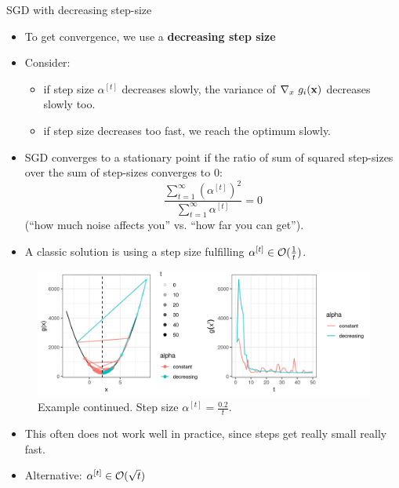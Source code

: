 \documentclass[11pt,compress,t,notes=noshow, xcolor=table]{beamer}
\begin{document}
\begin{vbframe}{SGD with decreasing step-size}

\begin{itemize}
	\item To get convergence, we use a \textbf{decreasing step size} 
	\item Consider: 
	\begin{itemize}
		\item if  step size $\alpha^{[t]}$ decreases slowly, the variance of $\nabla_x ~ g_i(\mathbf{x})$ decreases slowly too.
		\item if step size decreases too fast, we reach the optimum slowly.
	\end{itemize}
	\item SGD converges to a stationary point if the ratio of sum of squared step-sizes over the sum of step-sizes converges to $0$: 
	$$
		\frac{\sum_{t = 1}^\infty \left(\alpha^{[t]}\right)^2}{\sum_{t = 1}^\infty \alpha^{[t]}} = 0
	$$
	(``how much noise affects you'' vs. ``how far you can get''). 
\end{itemize}	

\framebreak 

\begin{itemize}
	\item A classic solution is using a step size fulfilling $\alpha^{[t]} \in \mathcal{O}(\frac{1}{t})$. 
\end{itemize}

 	\begin{figure}
 		\vspace{-0.3cm}
 		\centering
 		\includegraphics[width = 1\textwidth]{figure_man/sgd_example_decreasing_step_size.png} \newline
		Example continued. Step size $\alpha^{[t]} = \frac{0.2}{t}$. 
 	\end{figure}

\begin{itemize}
 	\item This often does not work well in practice, since steps get really small really fast. 
 	\item Alternative: $\alpha^{[t]} \in \mathcal{O}(\sqrt{t})$
\end{itemize}

\end{vbframe}
\end{document}
